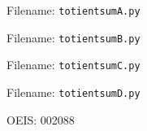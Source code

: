 \documentclass[12pt]{article}
\begin{document}
Filename: \texttt{totientsumA.py}
%

Filename: \texttt{totientsumB.py}
%

Filename: \texttt{totientsumC.py}
%

Filename: \texttt{totientsumD.py}
%



\nocite{*}

OEIS: 002088

\setlength{\bibitemsep}{\parskip}
\printbibliography[heading=bibnumbered]
\end{document}
